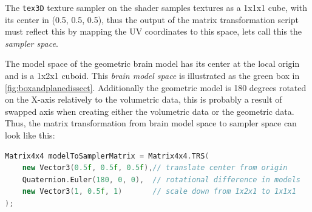 
The \texttt{tex3D} texture sampler on the shader samples textures as a 1x1x1 cube, with its center in (0.5, 0.5, 0.5), thus the output of the matrix transformation script must reflect this by mapping the UV coordinates to this space, lets call this the \textit{sampler space}. 

The model space of the geometric brain model has its center at the local origin and is a 1x2x1 cuboid. This \textit{brain model space} is illustrated as the green box in \autoref{fig:boxandplanedissect}. Additionally the geometric model is 180 degrees rotated on the X-axis relatively to the volumetric data, this is probably a result of swapped axis when creating either the volumetric data or the geometric data. Thus, the matrix transformation from brain model space to sampler space can look like this:

\begin{lstlisting}[language=c++]
Matrix4x4 modelToSamplerMatrix = Matrix4x4.TRS(
    new Vector3(0.5f, 0.5f, 0.5f),// translate center from origin
    Quaternion.Euler(180, 0, 0),  // rotational difference in models
    new Vector3(1, 0.5f, 1)       // scale down from 1x2x1 to 1x1x1
);
\end{lstlisting}

